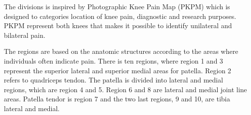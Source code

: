 \noindent
The divisions is inspired by Photographic Knee Pain Map (PKPM) which is designed to categories location of knee pain, diagnostic and research purposes. PKPM represent both knees that makes it possible to identify unilateral and bilateral pain.\citep{Elson2010}

\noindent
The regions are based on the anatomic structures according to the areas where individuals often indicate pain.
There is ten regions, where region 1 and 3 represent the superior lateral and superior medial areas for patella. Region 2 refers to quadriceps tendon. The patella is divided into lateral and medial regions, which are region 4 and 5. Region 6 and 8 are lateral and medial joint line areas. Patella tendor is region 7 and the two last regions, 9 and 10, are tibia lateral and medial.\citep{Elson2010}

\newpage
